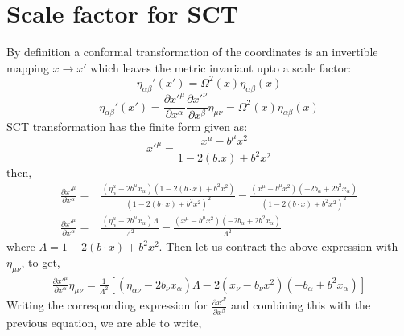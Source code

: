 \documentclass[]{article}
\numberwithin{equation}{section}
\begin{document}
\section{Scale factor for SCT}
By definition a conformal transformation of the coordinates is an invertible mapping $x\rightarrow x'$ which leaves the metric invariant upto a scale factor:
\begin{equation}
 \eta_{\alpha\beta}'(x') = \Omega^2(x) \eta_{\alpha\beta}(x)
\end{equation}
\begin{equation}
\eta_{\alpha\beta}'(x') =\frac{\partial {x'}^\mu}{\partial {x}^\alpha}\frac{\partial {x'}^\nu}{\partial {x}^\beta}\eta_{\mu\nu}= \Omega^2(x) \eta_{\alpha\beta}(x)
\end{equation}
SCT transformation has the finite form given as:
\begin{equation}
{x'}^{\mu} = \frac{x^{\mu}-b^{\mu}x^2}{1-2(b.x)+b^2x^2}
\end{equation}
then,
\begin{align}
    \frac{\partial {x'}^\mu}{\partial {x}^\alpha}=&\frac{(\eta^\mu_\alpha-2 b^\mu x_\alpha)(1-2(b\cdot x)+b^2x^2)}{(1-2(b\cdot x)+b^2x^2)^2}-\frac{(x^\mu-b^\mu x^2)(-2 b_\alpha+2 b^2 x_\alpha)}{\left ( 1-2(b\cdot x)+b^2x^2\right )^2}\\
    \frac{\partial {x'}^\mu}{\partial {x}^\alpha}=&\frac{(\eta^\mu_\alpha-2 b^\mu x_\alpha)\Lambda}{\Lambda^2}-\frac{(x^\mu-b^\mu x^2)(-2 b_\alpha+2 b^2 x_\alpha)}{\Lambda^2}
\end{align}
where $\Lambda= 1-2(b\cdot x)+b^2x^2$. Then let us contract the above expression with $\eta_{\mu\nu}$, to get,
\begin{align}
    \frac{\partial {x'}^\mu}{\partial {x}^\alpha}\eta_{\mu\nu}=\frac{1}{\Lambda^2}\left[(\eta_{\alpha\nu}-2 b_\nu x_\alpha)\Lambda-2(x_\nu-b_\nu x^2)(- b_\alpha+ b^2 x_\alpha)\right]
\end{align}
Writing the corresponding expression for $\frac{\partial {x'}^\nu}{\partial {x}^\beta}$ and combining this with the previous equation, we are able to write,
\end{document}
